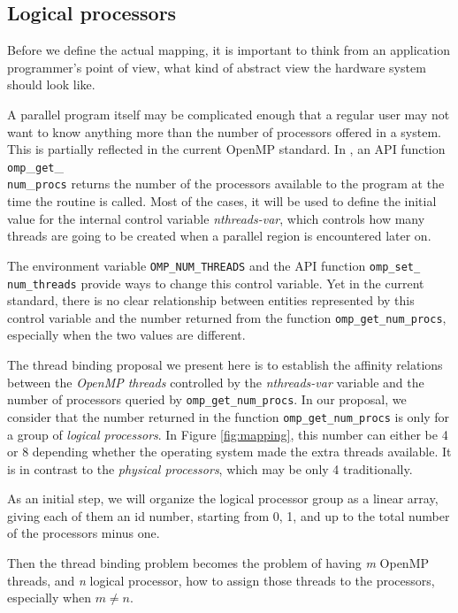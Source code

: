 \subsection{Logical processors}

Before we define the actual mapping, it is important to think from an
application programmer's point of view, what kind of abstract view the hardware
system should look like.

A parallel program itself may be complicated enough that a regular user may not
want to know anything more than the number of processors offered in a system.
This is partially reflected in the current OpenMP standard. In \cite{Ope05}, an
API function \texttt{omp}\_\texttt{get}\_\\\texttt{num}\_\texttt{procs} returns
the number of the processors available to the program at the time the routine
is called. Most of the cases, it will be used to define the initial value for
the internal control variable \emph{nthreads-var}, which controls how many
threads are going to be created when a parallel region is encountered later on.

The environment variable \texttt{OMP\_NUM\_THREADS} and the API function
\texttt{omp\_set\_\\num\_threads} provide ways to change this control variable.
Yet in the current standard, there is no clear relationship between entities
represented by this control variable and the number returned from the function
\texttt{omp\_get\_num\_procs}, especially when the two values are different. 

The thread binding proposal we present here is to establish the affinity
relations between the \emph{OpenMP threads} controlled by the
\emph{nthreads-var} variable and the number of processors queried by
\texttt{omp\_get\_num\_procs}. In our proposal, we consider that the number
returned in the function \texttt{omp\_get\_num\_procs} is only for a
group of \emph{logical processors}. In Figure \ref{fig:mapping}, this number
can either be 4 or 8 depending whether the operating system made the extra
threads available. It is in contrast to the \emph{physical processors}, which
may be only 4 traditionally.

As an initial step, we will organize the logical processor group as a linear
array, giving each of them an id number, starting from 0, 1, and up to the
total number of the processors minus one.

Then the thread binding problem becomes the problem of having \emph{m}
OpenMP threads, and \emph{n} logical processor, how to assign those threads to
the processors, especially when $m \not= n$.

